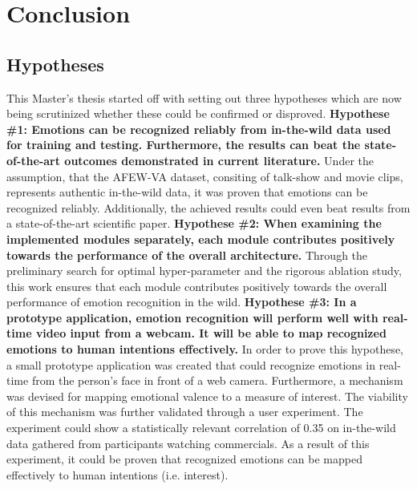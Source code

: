 
\chapter{Conclusion}
\section{Hypotheses}
This Master's thesis started off with setting out three hypotheses which are now being scrutinized whether these could be confirmed or disproved.\newline\newline
\textbf{Hypothese \#1: Emotions can be recognized reliably from in-the-wild data used for training and testing. Furthermore, the results can beat the state-of-the-art outcomes demonstrated in current literature.}\newline
Under the assumption, that the AFEW-VA dataset, consiting of talk-show and movie clips, represents authentic in-the-wild data, it was proven that emotions can be recognized reliably. Additionally, the achieved results could even beat results from a state-of-the-art scientific paper.
\newline\newline
\textbf{Hypothese \#2: When examining the implemented modules separately, each module contributes positively towards the performance of the overall architecture.}\newline
Through the preliminary search for optimal hyper-parameter and the rigorous ablation study, this work ensures that each module contributes positively towards the overall performance of emotion recognition in the wild.
\newline\newline
\textbf{Hypothese \#3: In a prototype application, emotion recognition will perform well with real-time video input from a webcam. It will be able to map recognized emotions to human intentions effectively.}\newline
In order to prove this hypothese, a small prototype application was created that could recognize emotions in real-time from the person's face in front of a web camera. Furthermore, a mechanism was devised for mapping emotional valence to a measure of interest. The viability of this mechanism was further validated through a user experiment. The experiment could show a statistically relevant correlation of 0.35 on in-the-wild data gathered from participants watching commercials. As a result of this experiment, it could be proven that recognized emotions can be mapped effectively to human intentions (i.e. interest).



